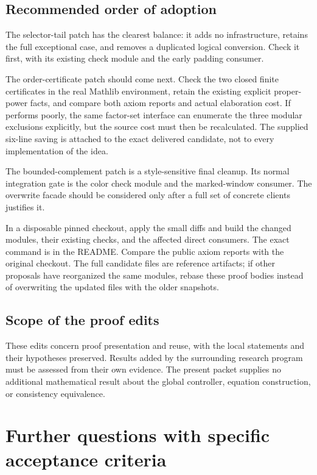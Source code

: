 \documentclass[11pt]{article}
\newcommand{\name}[1]{\texttt{\detokenize{#1}}}
\begin{document}
\subsection{Recommended order of adoption}

The selector-tail patch has the clearest balance: it adds no infrastructure,
retains the full exceptional case, and removes a duplicated logical
conversion. Check it first, with its existing check module and the early
padding consumer.

The order-certificate patch should come next. Check the two closed finite
certificates in the real Mathlib environment, retain the existing explicit
proper-power facts, and compare both axiom reports and actual elaboration
cost. If \name{decide} performs poorly, the same factor-set interface can
enumerate the three modular exclusions explicitly, but the source cost must
then be recalculated. The supplied six-line saving is attached to the exact
delivered candidate, not to every implementation of the idea.

The bounded-complement patch is a style-sensitive final cleanup. Its normal
integration gate is the color check module and the marked-window consumer.
The overwrite facade should be considered only after a full set of concrete
clients justifies it.

In a disposable pinned checkout, apply the small diffs and build the changed
modules, their existing checks, and the affected direct consumers. The exact
command is in the README. Compare the public axiom reports with the original
checkout. The full candidate files are reference artifacts; if other proposals
have reorganized the same modules, rebase these proof bodies instead of
overwriting the updated files with the older snapshots.

\subsection{Scope of the proof edits}

These edits concern proof presentation and reuse, with the local statements
and their hypotheses preserved. Results added by the surrounding research
program must be assessed from their own evidence. The present packet supplies
no additional mathematical result about the global controller, equation
construction, or consistency equivalence.

\section{Further questions with specific acceptance criteria}
\end{document}
